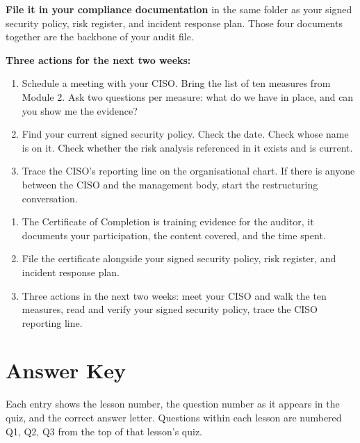 \documentclass[11pt,a4paper,twoside]{book}
\begin{document}
\textbf{File it in your compliance documentation} in the same folder as your signed security policy, risk register, and incident response plan. Those four documents together are the backbone of your audit file.

\textbf{Three actions for the next two weeks:}
\begin{enumerate}
  \item Schedule a meeting with your CISO. Bring the list of ten measures from Module 2. Ask two questions per measure: what do we have in place, and can you show me the evidence?
  \item Find your current signed security policy. Check the date. Check whose name is on it. Check whether the risk analysis referenced in it exists and is current.
  \item Trace the CISO's reporting line on the organisational chart. If there is anyone between the CISO and the management body, start the restructuring conversation.
\end{enumerate}

\begin{keytakeaways}
\begin{enumerate}
  \item The Certificate of Completion is training evidence for the auditor, it documents your participation, the content covered, and the time spent.
  \item File the certificate alongside your signed security policy, risk register, and incident response plan.
  \item Three actions in the next two weeks: meet your CISO and walk the ten measures, read and verify your signed security policy, trace the CISO reporting line.
\end{enumerate}
\end{keytakeaways}


\appendix


\chapter{Answer Key}

Each entry shows the lesson number, the question number as it appears in the quiz, and the correct answer letter. Questions within each lesson are numbered Q1, Q2, Q3 from the top of that lesson's quiz.
\end{document}
